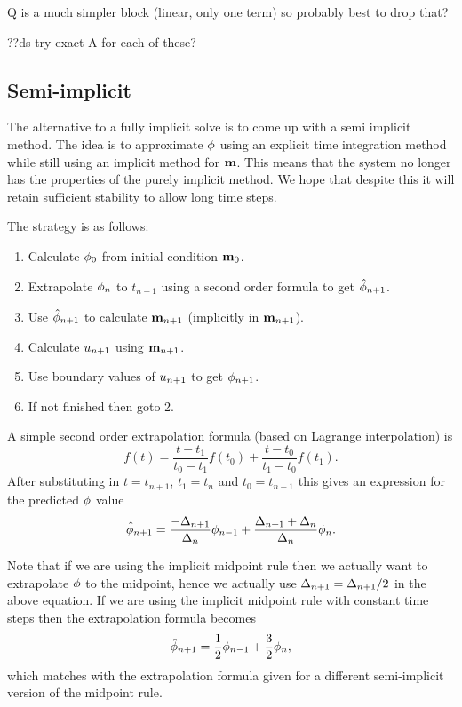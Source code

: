 Q is a much simpler block (linear, only one term) so probably best to drop that?

??ds try exact A for each of these?


\subsection{Semi-implicit}

The alternative to a fully implicit solve is to come up with a semi implicit method.
The idea is to approximate $\phi$ using an explicit time integration method while still using an implicit method for $\mathbf{m}$.
This means that the system no longer has the properties of the purely implicit method.
We hope that despite this it will retain sufficient stability to allow long time steps.

The strategy is as follows:
\begin{enumerate}
\item Calculate $\phi_0$ from initial condition $\mathbf{m}_0$.
\item Extrapolate $\phi_n$ to $t_{n+1}$ using a second order formula to get $\hat{\phi}_{n+1}$.
\item Use $\hat{\phi}_{n+1}$ to calculate $\mathbf{m}_{n+1}$ (implicitly in $\mathbf{m}_{n+1}$).
\item Calculate $u_{n+1}$ using $\mathbf{m}_{n+1}$.
\item Use boundary values of $u_{n+1}$ to get $\phi_{n+1}$.
\item If not finished then goto 2.
\end{enumerate}

A simple second order extrapolation formula (based on Lagrange interpolation\cite[pg. 312]{Kincaid2002}) is 
\begin{equation}
  \label{eq:65}
  f(t) = \frac{t - t_1}{t_0 - t_1}f(t_0) + \frac{t - t_0}{t_1 - t_0}f(t_1).
\end{equation}
After substituting in $t=t_{n+1}$, $t_1=t_n$ and $t_0=t_{n-1}$ this gives an expression for the predicted $\phi$ value
\begin{equation}
  \label{eq:66}
  \hat{\phi}_{n+1} = \frac{-\Delta_{n+1}}{\Delta_{n}} \phi_{n-1} + \frac{\Delta_{n+1} + \Delta_{n}}{\Delta_{n}} \phi_n.
\end{equation}

Note that if we are using the implicit midpoint rule then we actually want to extrapolate $\phi$ to the midpoint, hence we actually use $\Delta_{n+1} = \Delta_{n+1} /2$ in the above equation.
If we are using the implicit midpoint rule with constant time steps then the extrapolation formula becomes
\begin{equation}
  \label{eq:67}
  \hat{\phi}_{n+1} = \frac{1}{2} \phi_{n-1} + \frac{3}{2} \phi_n,
\end{equation}
which matches with the extrapolation formula given for a different semi-implicit version of the midpoint rule\cite{Serpico2001}.


